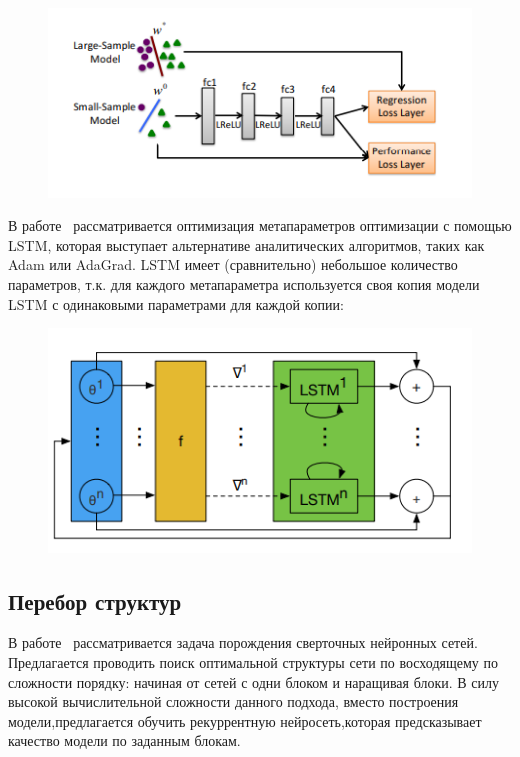 \documentclass{article}
\begin{document}
\begin{figure}[H]
\includegraphics[width=\textwidth]{./arch_review_figs/l2l_scheme.png}
\end{figure}

В работе~\cite{l2l_by_gd_gd} рассматривается оптимизация метапараметров оптимизации с помощью LSTM, которая выступает альтернативе аналитических алгоритмов, таких как Adam или AdaGrad. LSTM имеет  (сравнительно) небольшое количество параметров, т.к. для каждого метапараметра используется своя копия модели LSTM с одинаковыми параметрами для каждой копии:
\begin{figure}[H]
\includegraphics[width=\textwidth]{./arch_review_figs/l2lbygd.png}
\end{figure}




\subsection{Перебор структур}
В работе~\cite{search_smbo} рассматривается задача порождения сверточных нейронных сетей. Предлагается проводить поиск оптимальной структуры сети по восходящему по сложности порядку: начиная от сетей с одни блоком и наращивая блоки. В силу высокой вычислительной сложности данного подхода, вместо построения модели,предлагается обучить рекуррентную нейросеть,которая предсказывает качество модели по заданным блокам. 
\end{document}
